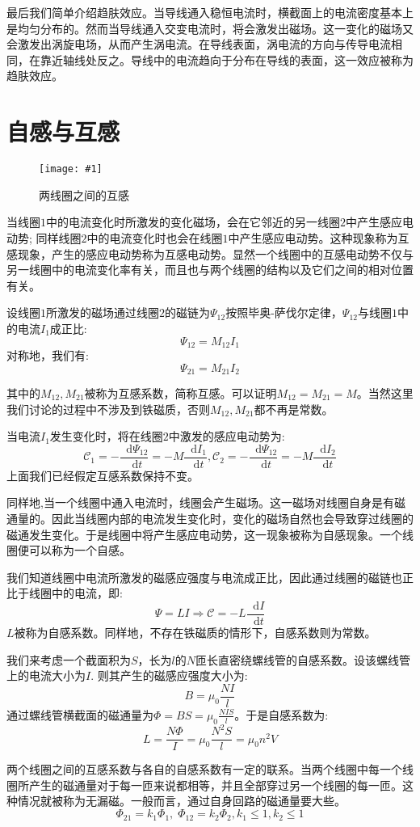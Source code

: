 \documentclass[12pt,a4paper,oneside]{report}
\theoremstyle{definition}
\theoremstyle{remark}
\newcommand{\insertfig}[3]{
    \begin{figure}[ht]
        \centering
        \texttt{[image: \#1]}
        \caption{#2}
        \label{fig:#1}
    \end{figure}
}
\renewcommand{\d}{\mathop{}\!\mathrm{d}}
\begin{document}
最后我们简单介绍趋肤效应。当导线通入稳恒电流时，横截面上的电流密度基本上是均匀分布的。然而当导线通入交变电流时，将会激发出磁场。这一变化的磁场又会激发出涡旋电场，从而产生涡电流。在导线表面，涡电流的方向与传导电流相同，在靠近轴线处反之。导线中的电流趋向于分布在导线的表面，这一效应被称为趋肤效应。

\section{自感与互感}
\insertfig{4-4.png}{两线圈之间的互感}{0.3}
当线圈$1$中的电流变化时所激发的变化磁场，会在它邻近的另一线圈$2$中产生感应电动势; 同样线圈$2$中的电流变化时也会在线圈$1$中产生感应电动势。这种现象称为互感现象，产生的感应电动势称为互感电动势。显然一个线圈中的互感电动势不仅与另一线圈中的电流变化率有关，而且也与两个线圈的结构以及它们之间的相对位置有关。

设线圈$1$所激发的磁场通过线圈$2$的磁链为$\Psi_{12}$按照毕奥-萨伐尔定律，$\Psi_{12}$与线圈$1$中的电流$I_1$成正比:
\[
\Psi_{12} = M_{12} I_1
\]
对称地，我们有:
\[
\Psi_{21} = M_{21} I_2
\]

其中的$M_{12},M_{21}$被称为互感系数，简称互感。可以证明$M_{12}=M_{21}=M$。当然这里我们讨论的过程中不涉及到铁磁质，否则$M_{12},M_{21}$都不再是常数。

当电流$I_1$发生变化时，将在线圈$2$中激发的感应电动势为:
\[
\mathscr C_1 = -\frac{\d \Psi_{12}}{\d t} = -M\frac{\d I_1}{\d t}, \mathscr C_2 = -\frac{\d \Psi_{12}}{\d t} = -M\frac{\d I_2}{\d t}
\]
上面我们已经假定互感系数保持不变。

同样地,当一个线圈中通入电流时，线圈会产生磁场。这一磁场对线圈自身是有磁通量的。因此当线圈内部的电流发生变化时，变化的磁场自然也会导致穿过线圈的磁通发生变化。于是线圈中将产生感应电动势，这一现象被称为自感现象。一个线圈便可以称为一个自感。

我们知道线圈中电流所激发的磁感应强度与电流成正比，因此通过线圈的磁链也正比于线圈中的电流，即:
\[
\Psi = LI \Rightarrow \mathscr C = -L\frac{\d I}{\d t}
\]
$L$被称为自感系数。同样地，不存在铁磁质的情形下，自感系数则为常数。

我们来考虑一个截面积为$S$，长为$l$的$N$匝长直密绕螺线管的自感系数。设该螺线管上的电流大小为$I$. 则其产生的磁感应强度大小为:
\[
B = \mu_0\frac{NI}{l}
\]
通过螺线管横截面的磁通量为$\Phi= BS=\mu_0\frac{NIS}{l}$。于是自感系数为:
\[
L =\frac{N\Phi}{I}=\mu_0\frac{N^2S}{l} = \mu_0 n^2 V
\]

两个线圈之间的互感系数与各自的自感系数有一定的联系。当两个线圈中每一个线圈所产生的磁通量对于每一匝来说都相等，并且全部穿过另一个线圈的每一匝。这种情况就被称为无漏磁。一般而言，通过自身回路的磁通量要大些。
\[
\Phi_{21} = k_1 \Phi_1, \;\Phi_{12} = k_2 \Phi_2, k_1\le 1, k_2\le 1
\]
\end{document}
